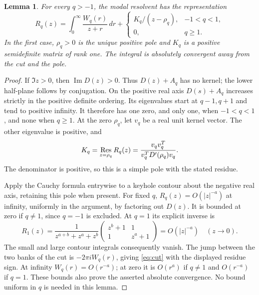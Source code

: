 \documentclass[11pt]{article}
\newtheorem{lemma}[theorem]{Lemma}
\DeclareMathOperator{\Imat}{Im}
\begin{document}
\begin{lemma}\label{lem:representation}
For every $q>-1$, the modal resolvent has the representation
\begin{equation}\label{eq:cut}
 R_q(z)=\int_0^\infty\frac{W_q(r)}{z+r}\,dr
       +\begin{cases}K_q/(z-\rho_q),&-1<q<1,\\0,&q\ge1.
         \end{cases}
\end{equation}
In the first case, $\rho_q>0$ is the unique positive pole and $K_q$ is a
positive semidefinite matrix of rank one. The integral is absolutely
convergent away from the cut and the pole.
\end{lemma}

\begin{proof}
If $\Im z>0$, then $\Imat D(z)>0$. Thus $D(z)+A_q$ has no kernel;
the lower half-plane follows by conjugation. On the positive real axis
$D(s)+A_q$ increases strictly in the positive definite ordering. Its
eigenvalues start at $q-1,q+1$ and tend to positive infinity. It therefore
has one zero, and only one, when $-1<q<1$, and none when $q\ge1$.
At the zero $\rho_q$, let $v_q$ be a real unit kernel vector. The other
eigenvalue is positive, and
\[
 K_q=\mathop{\rm Res}_{z=\rho_q}R_q(z)
     =\frac{v_qv_q^T}{v_q^TD'(\rho_q)v_q}.
\]
The denominator is positive, so this is a simple pole with the stated
residue.

Apply the Cauchy formula entrywise to a keyhole contour about the negative
real axis, retaining this pole when present. For fixed $q$,
$R_q(z)=O(|z|^{-a})$ at infinity, uniformly in the argument, by factoring
out $D(z)$. It is bounded at zero if $q\ne1$, since $q=-1$ is excluded.
At $q=1$ its explicit inverse is
\begin{equation}\label{eq:critical-resolvent}
 R_1(z)=\frac1{z^{a+b}+z^a+z^b}
        \begin{pmatrix}z^b+1&1\\1&z^a+1\end{pmatrix}
        =O(|z|^{-a})\quad(z\to0).
\end{equation}
The small and large contour integrals consequently vanish. The jump
between the two banks of the cut is $-2\pi iW_q(r)$, giving
\eqref{eq:cut} with the displayed residue sign.
At infinity $W_q(r)=O(r^{-a})$; at zero it is $O(r^a)$ if $q\ne1$ and
$O(r^{-a})$ if $q=1$. These bounds also prove the asserted absolute
convergence. No bound uniform in $q$ is needed in this lemma.
\end{proof}
\end{document}
